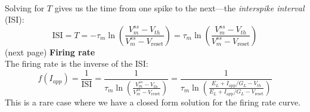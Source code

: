 \documentclass{report}
\begin{document}
\vspace{1mm}\\
Solving for $T$ gives us the time from one spike to the next---the \textit{interspike interval} (ISI):
\begin{equation*}
\text{ISI}=T=-\tau_m\ln\left(\frac{V^{ss}_m-V_{th}}{V^{ss}_m-V_\text{reset}}\right)
=\tau_m\ln\left(\frac{V^{ss}_m-V_{th}}{V^{ss}_m-V_\text{reset}}\right)
\end{equation*}
(next page)
\newpage
\noindent\textbf{Firing rate}\\
The firing rate is the inverse of the ISI:
\begin{equation*}
f(I_{app})=\frac{1}{\text{ISI}}=\frac{1}{\tau_m\ln\left(\frac{V^{ss}_m-V_{th}}{V^{ss}_m-V_\text{reset}}\right)}=
\frac{1}{\tau_m\ln\left(\frac{E_L+I_{\text{app}}/G_L-V_{th}}{E_L+I_{\text{app}}/G_L-V_\text{reset}}\right)}
\end{equation*}
This is a rare case where we have a closed form solution for the firing rate curve. 
\newpage
\end{document}
